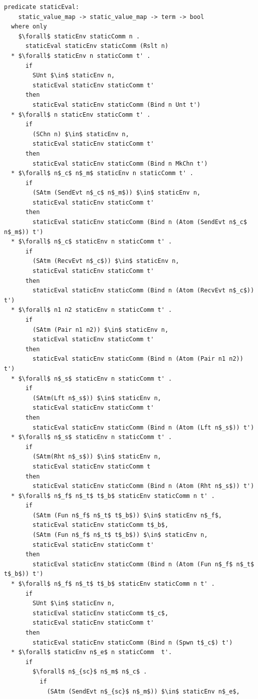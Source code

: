 \documentclass[letterpaper, 11pt]{extarticle}
\begin{document}
\begin{lstlisting}[language=logic, mathescape]
  predicate staticEval:
    static_value_map -> static_value_map -> term -> bool
  where only
    $\forall$ staticEnv staticComm n .
      staticEval staticEnv staticComm (Rslt n)
  * $\forall$ staticEnv n staticComm t' .
      if 
        SUnt $\in$ staticEnv n,
        staticEval staticEnv staticComm t'
      then
        staticEval staticEnv staticComm (Bind n Unt t')
  * $\forall$ n staticEnv staticComm t' .
      if 
        (SChn n) $\in$ staticEnv n,
        staticEval staticEnv staticComm t'
      then  
        staticEval staticEnv staticComm (Bind n MkChn t')
  * $\forall$ n$_c$ n$_m$ staticEnv n staticComm t' .
      if
        (SAtm (SendEvt n$_c$ n$_m$)) $\in$ staticEnv n,
        staticEval staticEnv staticComm t' 
      then
        staticEval staticEnv staticComm (Bind n (Atom (SendEvt n$_c$ n$_m$)) t')
  * $\forall$ n$_c$ staticEnv n staticComm t' . 
      if 
        (SAtm (RecvEvt n$_c$)) $\in$ staticEnv n,
        staticEval staticEnv staticComm t'
      then
        staticEval staticEnv staticComm (Bind n (Atom (RecvEvt n$_c$)) t')
  * $\forall$ n1 n2 staticEnv n staticComm t' .
      if
        (SAtm (Pair n1 n2)) $\in$ staticEnv n,
        staticEval staticEnv staticComm t'
      then
        staticEval staticEnv staticComm (Bind n (Atom (Pair n1 n2)) t')
  * $\forall$ n$_s$ staticEnv n staticComm t' .
      if
        (SAtm(Lft n$_s$)) $\in$ staticEnv n,
        staticEval staticEnv staticComm t' 
      then
        staticEval staticEnv staticComm (Bind n (Atom (Lft n$_s$)) t')
  * $\forall$ n$_s$ staticEnv n staticComm t' .
      if
        (SAtm(Rht n$_s$)) $\in$ staticEnv n, 
        staticEval staticEnv staticComm t
      then
        staticEval staticEnv staticComm (Bind n (Atom (Rht n$_s$)) t')
  * $\forall$ n$_f$ n$_t$ t$_b$ staticEnv staticComm n t' .
      if
        (SAtm (Fun n$_f$ n$_t$ t$_b$)) $\in$ staticEnv n$_f$, 
        staticEval staticEnv staticComm t$_b$, 
        (SAtm (Fun n$_f$ n$_t$ t$_b$)) $\in$ staticEnv n, 
        staticEval staticEnv staticComm t'
      then
        staticEval staticEnv staticComm (Bind n (Atom (Fun n$_f$ n$_t$ t$_b$)) t')
  * $\forall$ n$_f$ n$_t$ t$_b$ staticEnv staticComm n t' .
      if
        SUnt $\in$ staticEnv n, 
        staticEval staticEnv staticComm t$_c$, 
        staticEval staticEnv staticComm t'
      then
        staticEval staticEnv staticComm (Bind n (Spwn t$_c$) t')
  * $\forall$ staticEnv n$_e$ n staticComm  t'.
      if
        $\forall$ n$_{sc}$ n$_m$ n$_c$ . 
          if
            (SAtm (SendEvt n$_{sc}$ n$_m$)) $\in$ staticEnv n$_e$, 

\end{lstlisting}
\end{document}
